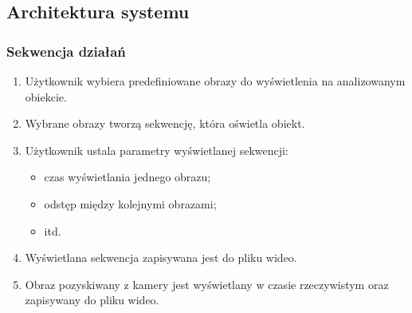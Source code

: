 \documentclass{beamer}
\begin{document}
\subsection{Architektura systemu}
\begin{frame}\frametitle{Sekwencja działań}
      \begin{enumerate}
       \item Użytkownik wybiera predefiniowane obrazy do wyświetlenia na analizowanym obiekcie.\pause
       \item Wybrane obrazy tworzą sekwencję, która oświetla obiekt.\pause
       \item Użytkownik ustala parametry wyświetlanej sekwencji: 
       \begin{itemize}
        \item czas wyświetlania jednego obrazu;
        \item odstęp między kolejnymi obrazami;
        \item itd.
       \end{itemize} \pause
       \item Wyświetlana sekwencja zapisywana jest do pliku wideo.\pause
       \item Obraz pozyskiwany z kamery jest wyświetlany w czasie rzeczywistym oraz zapisywany do pliku wideo.
      \end{enumerate}
\end{frame}
\end{document}
